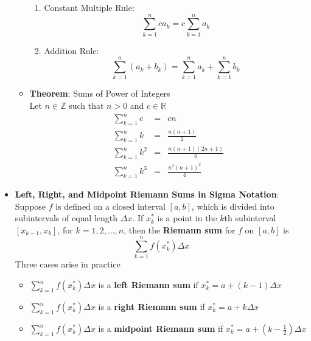 \documentclass{article}
\begin{document}
\begin{itemize}
\begin{itemize}
                \begin{enumerate}
                    \item Constant Multiple Rule:
                        $$\sum_{k = 1}^{n}{ca_k} = c\sum_{k = 1}^{n}{a_k}$$
                    \item Addition Rule:
                        $$\sum_{k = 1}^{n}{\left(a_k + b_k\right)} = \sum_{k = 1}^{n}{a_k} + \sum_{k = 1}^{n}{b_k}$$
                \end{enumerate}
            \item \textbf{Theorem}: Sums of Power of Integers \\
                Let $n \in \mathbb{Z}$ such that $n > 0$ and $c \in \mathbb{R}$
                \begin{eqnarray}
                    \sum_{k = 1}^{n}{c} &=& cn \\
                    \sum_{k = 1}^{n}{k} &=& \frac{n\left(n + 1\right)}{2} \\
                    \sum_{k = 1}^{n}{k^2} &=& \frac{n\left(n + 1\right)\left(2n + 1\right)}{6} \\
                    \sum_{k = 1}^{n}{k^3} &=& \frac{n^2\left(n + 1\right)^2}{4}
                \end{eqnarray}
        \end{itemize}
    \item \textbf{Left, Right, and Midpoint Riemann Sums in Sigma Notation}: \\
        Suppose $f$ is defined on a closed interval $[a,b]$, which is divided into subintervals of equal length $\Delta{x}$. If $x_k^*$ is a point in the $k$th subinterval $[x_{k - 1}, x_k]$, for $k = 1,2,...,n$, then the \textbf{Riemann sum} for $f$ on $[a,b]$ is $$\sum_{k = 1}^{n}{f(x_k^*)\Delta{x}}$$
        Three cases arise in practice
    \begin{itemize}
        \item $\sum\limits_{k = 1}^{n}{f(x_k^*)\Delta{x}}$ is a \textbf{left Riemann sum} if $x_k^* = a + (k - 1)\Delta{x}$
        \item $\sum\limits_{k = 1}^{n}{f(x_k^*)\Delta{x}}$ is a \textbf{right Riemann sum} if $x_k^* = a + k\Delta{x}$
        \item $\sum\limits_{k = 1}^{n}{f(x_k^*)\Delta{x}}$ is a \textbf{midpoint Riemann sum} if $x_k^* = a + (k - \frac{1}{2})\Delta{x}$
    \end{itemize}
\end{itemize}
\end{document}
